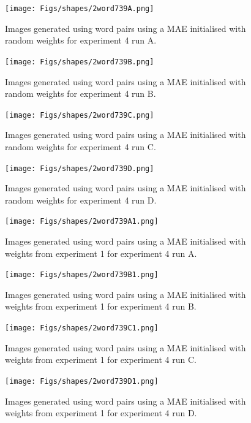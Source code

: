 \begin{figure}
\centering
\texttt{[image: Figs/shapes/2word739A.png]}
\caption{Images generated using word pairs using a MAE initialised with random weights for experiment 4 run A.}
\label{fig:2word739A}
\end{figure}

\begin{figure}
\centering
\texttt{[image: Figs/shapes/2word739B.png]}
\caption{Images generated using word pairs using a MAE initialised with random weights for experiment 4 run B.}
\label{fig:2word739B}
\end{figure}

\begin{figure}
\centering
\texttt{[image: Figs/shapes/2word739C.png]}
\caption{Images generated using word pairs using a MAE initialised with random weights for experiment 4 run C.}
\label{fig:2word739C}
\end{figure}

\begin{figure}
\centering
\texttt{[image: Figs/shapes/2word739D.png]}
\caption{Images generated using word pairs using a MAE initialised with random weights for experiment 4 run D.}
\label{fig:2word739D}
\end{figure}


\begin{figure}
\centering
\texttt{[image: Figs/shapes/2word739A1.png]}
\caption{Images generated using word pairs using a MAE initialised with weights from experiment 1 for experiment 4 run A.}
\label{fig:2word739A1}
\end{figure}

\begin{figure}
\centering
\texttt{[image: Figs/shapes/2word739B1.png]}
\caption{Images generated using word pairs using a MAE initialised with weights from experiment 1 for experiment 4 run B.}
\label{fig:2word739B1}
\end{figure}

\begin{figure}
\centering
\texttt{[image: Figs/shapes/2word739C1.png]}
\caption{Images generated using word pairs using a MAE initialised with weights from experiment 1 for experiment 4 run C.}
\label{fig:2word739C1}
\end{figure}

\begin{figure}
\centering
\texttt{[image: Figs/shapes/2word739D1.png]}
\caption{Images generated using word pairs using a MAE initialised with weights from experiment 1 for experiment 4 run D.}
\label{fig:2word739D1}
\end{figure}

